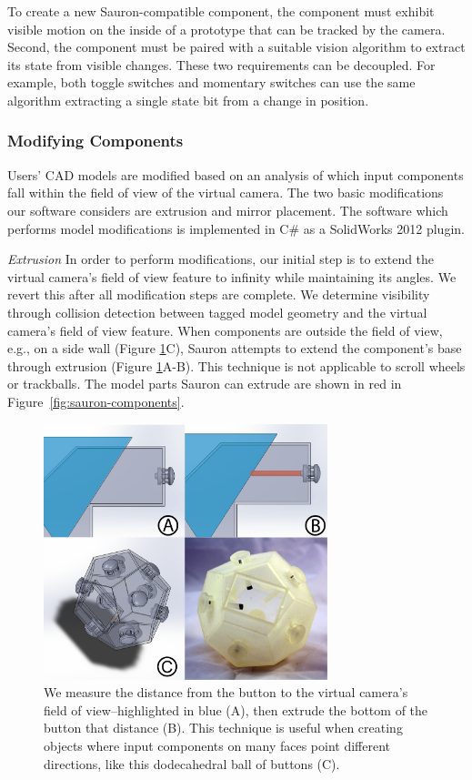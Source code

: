 To create a new Sauron-compatible component, the component must exhibit visible motion on the inside of a prototype that can be tracked by the camera. Second, the component must be paired with a suitable vision algorithm to extract its state from visible changes. These two requirements can be decoupled. 
For example, both toggle switches and momentary switches can use the same algorithm extracting a single state bit from a change in position.

\subsubsection{Modifying Components}
Users' CAD models are modified based on an analysis of which input components fall within the field of view of the virtual camera. The two basic modifications our software considers are extrusion and mirror placement. The software which performs model modifications is implemented in C\# as a SolidWorks 2012 plugin. 

\emph{Extrusion}
In order to perform modifications, our initial step is to extend the virtual camera's field of view feature to infinity while maintaining its angles. We revert this after all modification steps are complete. We determine visibility through collision detection between tagged model geometry and the virtual camera's field of view feature.
When components are outside the field of view, e.g., on a side wall (Figure \ref{fig:sauron-extrusion}C), Sauron attempts to extend the component's base through extrusion (Figure \ref{fig:sauron-extrusion}A-B). This technique is not applicable to scroll wheels or trackballs. The model parts Sauron can extrude are shown in red in Figure~\ref{fig:sauron-components}.

\begin{figure}
\centering
\includegraphics[width=3.25in]{figures/sauron/fig6-extrude-and-dodecahedron.png}
\caption{We measure the distance from the button to the virtual camera's field of view--highlighted in blue (A), then extrude the bottom of the button that distance (B).  This technique is useful when creating objects where input components on many faces point different directions, like this dodecahedral ball of buttons (C).}
\label{fig:sauron-extrusion}
\end{figure}

